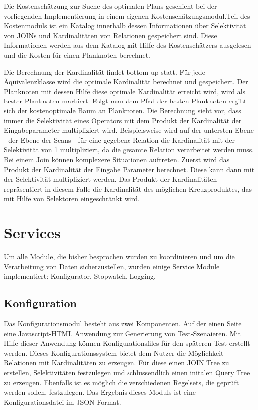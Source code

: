 Die Kostenschätzung zur Suche des optimalen Plans geschieht bei der vorliegenden Implementierung in einem eigenen Kostenschätzungsmodul.Teil des Kostenmoduls ist ein Katalog innerhalb dessen Informationen über Selektivität von JOINs und Kardinalitäten von Relationen gespeichert sind. Diese Informationen werden aus dem Katalog mit Hilfe des Kostenschätzers ausgelesen und die Kosten für einen Planknoten berechnet.

Die Berechnung der Kardinalität findet bottom up statt. Für jede Äquivalenzklasse wird die optimale Kardinalität berechnet und gespeichert. Der Planknoten mit dessen Hilfe diese optimale Kardinalität erreicht wird, wird als bester Planknoten markiert. Folgt man dem Pfad der besten Planknoten ergibt sich der kostenoptimale Baum an Planknoten. Die Berechnung sieht vor, dass immer die Selektivität eines Operators mit dem Produkt der Kardinalität der Eingabeparameter multipliziert wird. Beispielsweise wird auf der untersten Ebene - der Ebene der Scans - für eine gegebene Relation die Kardinalität mit der Selektivität von 1 multipliziert, da die gesamte Relation verarbeitet werden muss. Bei einem Join können komplexere Situationen auftreten. Zuerst wird das Produkt der Kardinalität der Eingabe Parameter berechnet. Diese kann dann mit der 
Selektivität multipliziert werden. Das Produkt der Kardinalitäten repräsentiert in diesem Falle die Kardinalität des möglichen Kreuzproduktes, das mit Hilfe von Selektoren eingeschränkt wird.


\section{Services}
Um alle Module, die bisher besprochen wurden zu koordinieren und um die Verarbeitung von Daten sicherzustellen, wurden einige Service Module implementiert: Konfigurator, Stopwatch, Logging.

\subsection{Konfiguration}

Das Konfigurationsmodul besteht aus zwei Komponenten. Auf der einen Seite eine Javascript-HTML Anwendung zur Generierung von Test-Szenaieren. Mit Hilfe dieser Anwendung können Konfigurationsfiles für den späteren Test erstellt werden. Dieses Konfigurationssystem bietet dem Nutzer die Möglichkeit Relationen mit Kardinalitäten zu erzeugen. Für diese einen JOIN Tree zu erstellen, Selektivitäten festzulegen und schlussendlich einen initalen Query Tree zu erzeugen. Ebenfalls ist es möglich die verschiedenen Regelsets, die geprüft werden sollen, festzulegen.
Das Ergebnis dieses Moduls ist eine Konfigurationsdatei im JSON Format.

